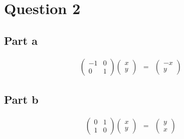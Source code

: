 \section*{Question 2}
\subsection*{Part a}
\begin{eqnarray*}
  \left(\begin{array}{cc}
  -1 & 0 \\
  0 & 1
  \end{array}\right)\left(\begin{array}{cc}
  x \\
  y
  \end{array}\right) &=& \left(\begin{array}{cc}
  -x \\
  y
  \end{array}\right)
\end{eqnarray*}
\subsection*{Part b}
\begin{eqnarray*}
  \left(\begin{array}{cc}
  0 & 1 \\
  1 & 0
  \end{array}\right)\left(\begin{array}{cc}
  x \\
  y
  \end{array}\right) &=& \left(\begin{array}{cc}
  y \\
  x
  \end{array}\right)
\end{eqnarray*}